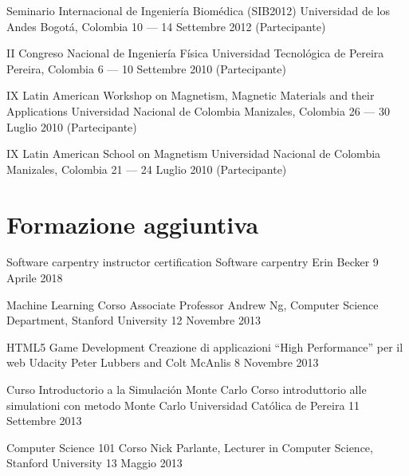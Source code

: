 \documentclass[12pt,english]{moderncv}
\begin{document}
        {Seminario Internacional de Ingeniería Biomédica (SIB2012)}
        {Universidad de los Andes}
        {Bogotá, Colombia}
        {10 --- 14 Settembre 2012}
        {(Partecipante)}

        {II Congreso Nacional de Ingeniería Física}
        {Universidad Tecnol\'ogica de Pereira}
        {Pereira, Colombia}
        {6 --- 10 Settembre 2010}
        {(Partecipante)}

        {IX Latin American Workshop on Magnetism, Magnetic Materials and their Applications}
        {Universidad Nacional de Colombia}
        {Manizales, Colombia}
        {26 --- 30 Luglio 2010}
        {(Partecipante)}

        {IX Latin American School on Magnetism}
        {Universidad Nacional de Colombia}
        {Manizales, Colombia}
        {21 --- 24 Luglio 2010}
        {(Partecipante)}


\section{Formazione aggiuntiva}

        {Software carpentry instructor certification}
        {}
        {Software carpentry}
        {Erin Becker}
        {9 Aprile 2018}

        {Machine Learning}
        {}
        {Corso}
        {Associate Professor Andrew Ng, Computer Science Department, Stanford University}
        {12 Novembre 2013}

        {HTML5 Game Development}
        {Creazione di applicazioni ``High Performance'' per il web}
        {Udacity}
        {Peter Lubbers and Colt McAnlis}
        {8 Novembre 2013}

        {Curso Introductorio a la Simulación Monte Carlo}
        {Corso introduttorio alle simulationi con metodo Monte Carlo}
        {Universidad Católica de Pereira}
        {}
        {11 Settembre 2013}

        {Computer Science 101}
        {}
        {Corso}
        {Nick Parlante, Lecturer in Computer Science, Stanford University}
        {13 Maggio 2013}
\end{document}
